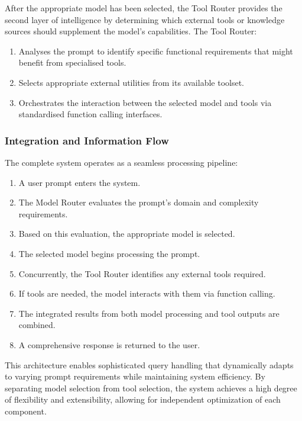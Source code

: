 After the appropriate model has been selected, the Tool Router provides the second layer of intelligence by determining which external tools or knowledge sources should supplement the model's capabilities. The Tool Router:

\begin{enumerate}
    \item Analyses the prompt to identify specific functional requirements that might benefit from specialised tools.
    \item Selects appropriate external utilities from its available toolset.
    \item Orchestrates the interaction between the selected model and tools via standardised function calling interfaces.
\end{enumerate}

\subsubsection{Integration and Information Flow}

The complete system operates as a seamless processing pipeline:

\begin{enumerate}
    \item A user prompt enters the system.
    \item The Model Router evaluates the prompt's domain and complexity requirements.
    \item Based on this evaluation, the appropriate model is selected.
    \item The selected model begins processing the prompt.
    \item Concurrently, the Tool Router identifies any external tools required.
    \item If tools are needed, the model interacts with them via function calling.
    \item The integrated results from both model processing and tool outputs are combined.
    \item A comprehensive response is returned to the user.
\end{enumerate}

This architecture enables sophisticated query handling that dynamically adapts to varying prompt requirements while maintaining system efficiency. By separating model selection from tool selection, the system achieves a high degree of flexibility and extensibility, allowing for independent optimization of each component.

